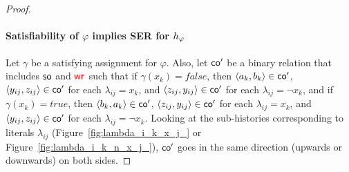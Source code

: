 \begin{proof}
\paragraph{Satisfiability of $\varphi$ implies SER for ${h}_\varphi$}
Let $\gamma$ be a satisfying assignment for $\varphi$. Also, let $\textsf{co}'$ be a binary relation that includes $\mathsf{so}$ and $\textcolor{red}{\mathsf{wr}_{}}$ such that if $\gamma(x_k)=\mathit{false}$, then ${\left\langle{a_k, b_k}\right\rangle} \in \textsf{co}'$, ${\left\langle{y_{ij}, z_{ij}}\right\rangle} \in \textsf{co}'$ for each $\lambda_{ij} = x_k$, and ${\left\langle{z_{ij}, y_{ij}}\right\rangle} \in \textsf{co}'$ for each $\lambda_{ij} = \neg x_k$, and if $\gamma(x_k)=\mathit{true}$, then ${\left\langle{b_k, a_k}\right\rangle} \in \textsf{co}'$, ${\left\langle{z_{ij}, y_{ij}}\right\rangle} \in \textsf{co}'$ for each $\lambda_{ij} = x_k$, and ${\left\langle{y_{ij}, z_{ij}}\right\rangle} \in \textsf{co}'$ for each $\lambda_{ij} = \neg x_k$. Looking at the sub-histories corresponding to literals $\lambda_{ij}$ (Figure~\ref{fig:lambda_i_k_x_j_} or Figure~\ref{fig:lambda_i_k_n_x_j_}), $\mathsf{co}'$ goes in the same direction (upwards or downwards) on both sides. 


\end{proof}
